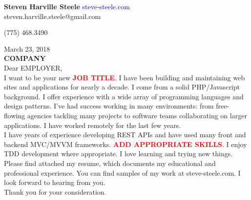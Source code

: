 \documentclass[11pt]{ncsuthesis4}
\newcommand{\tab}{\hspace*{20em}}
\begin{document}
\oddsidemargin 0.25in
\evensidemargin 0.25in
\textwidth 6.0in
\topmargin 0.25in
\textheight 8.0in
\renewcommand{\baselinestretch}{2}
\renewcommand{\headrulewidth}{0pt}
\thispagestyle{empty}
\rhead{\thepage}
\setlength{\headsep}{0in}
\setlength{\parindent}{2em}




\noindent \textbf{\Large Steven Harville Steele} \hfill \textcolor{blue}{steve-steele.com}
\\

\hfill steven.harville.steele@gmail.com

\hfill (775) 468.3490

\noindent March 23, 2018\\%

\noindent \textbf{COMPANY}\\%

\noindent Dear EMPLOYER,%
\\

\noindent
I want to be your new \textcolor{red}{\textbf{JOB TITLE}}. I have been building and maintaining web sites and applications for nearly a decade. I come from a solid PHP/Javascript background. I offer experience with a wide array of programming languages and design patterns. I've had success working in many environments: from free-flowing agencies tackling many projects to software teams collaborating on larger applications. I have worked remotely for the last few years.
\\

\noindent
I have years of experience developing REST APIs and have used many front and backend MVC/MVVM frameworks. \textcolor{red}{\textbf{ADD APPROPRIATE SKILLS}}. I enjoy TDD development where appropriate. I love learning and trying new things.
\\

\noindent Please find attached my resume, which documents my educational and professional experience. You can find samples of my work at steve-steele.com. I look forward to hearing from you.
\\

\noindent Thank you for your consideration.
\\

\tab{Sincerely,}

\tab{Steve Steele}




\nocite{*}
\end{document}
